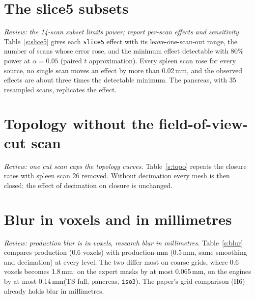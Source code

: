 \documentclass[conference]{IEEEtran}
\newcommand{\lvl}[1]{\texttt{#1}}
\newcommand{\mm}{\,mm\xspace}
\begin{document}
\begin{table}[!t]
\caption{Sampling models for the canonical ASSD (mm) of the resampled expert mask. Coefficients in mm per mm ($c$ in mm$^0$); PI: 95\% prediction interval; PI cov.: share of pancreas points inside the spleen PI.}
\label{s:models}
\centering\footnotesize

\end{table}

\section{The slice5 subsets}
\emph{Review: the 14-scan subset limits power; report per-scan effects and sensitivity.} Table~\ref{s:slice5} gives each \lvl{slice5} effect with its leave-one-scan-out range, the number of scans whose error rose, and the minimum effect detectable with 80\% power at $\alpha=0.05$ (paired $t$ approximation). Every spleen scan rose for every source, no single scan moves an effect by more than 0.02\mm, and the observed effects are about three times the detectable minimum. The pancreas, with 35 resampled scans, replicates the effect.

\begin{table}[!t]
\caption{Paired change in canonical ASSD from native to \lvl{slice5} (mm). MDE: minimum detectable effect, 80\% power.}
\label{s:slice5}
\centering\footnotesize

\end{table}

\section{Topology without the field-of-view-cut scan}
\emph{Review: one cut scan caps the topology curves.} Table~\ref{s:topo} repeats the closure rates with spleen scan 26 removed. Without decimation every mesh is then closed; the effect of decimation on closure is unchanged.

\begin{table}[!t]
\caption{Share of closed meshes (\%) over the grid by decimation: all scans / without the field-of-view-cut scan.}
\label{s:topo}
\centering\footnotesize

\end{table}

\section{Blur in voxels and in millimetres}
\emph{Review: production blur is in voxels, research blur in millimetres.} Table~\ref{s:blur} compares production (0.6 voxels) with production-mm (0.5\mm, same smoothing and decimation) at every level. The two differ most on coarse grids, where 0.6 voxels becomes 1.8\mm: on the expert masks by at most 0.065\mm, on the engines by at most 0.14\mm (TS full, pancreas, \lvl{iso3}). The paper's grid comparison (H6) already holds blur in millimetres.
\end{document}

